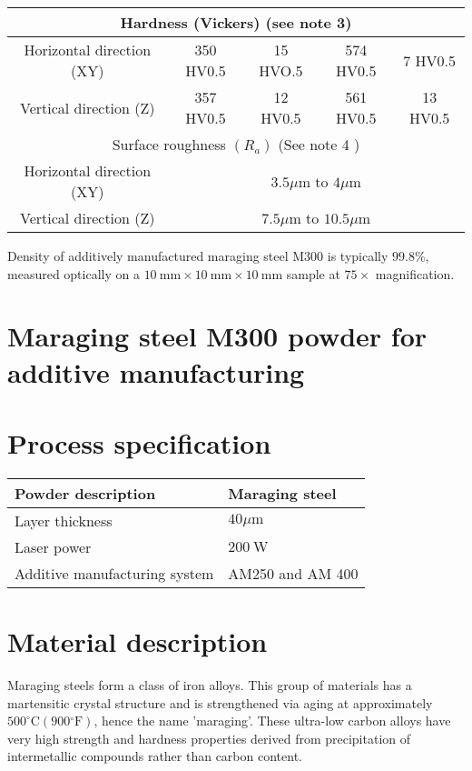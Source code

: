 \documentclass[10pt]{article}
\begin{document}
\begin{center}
\begin{tabular}{|c|c|c|c|c|}
\hline
\multicolumn{5}{|c|}{Hardness (Vickers) (see note 3)} \\
\hline
Horizontal direction (XY) & 350 HV0.5 & 15 HVO.5 & 574 HV0.5 & 7 HV0.5 \\
\hline
Vertical direction (Z) & 357 HV0.5 & 12 HV0.5 & 561 HV0.5 & 13 HV0.5 \\
\hline
\multicolumn{5}{|c|}{Surface roughness $\left(R_{a}\right)$ (See note 4 )} \\
\hline
Horizontal direction (XY) & \multicolumn{4}{|c|}{$3.5 \mu \mathrm{m}$ to $4 \mu \mathrm{m}$} \\
\hline
Vertical direction (Z) & \multicolumn{4}{|c|}{$7.5 \mu \mathrm{m}$ to $10.5 \mu \mathrm{m}$} \\
\hline
\end{tabular}
\end{center}

Density of additively manufactured maraging steel M300 is typically $99.8 \%$, measured optically on a $10 \mathrm{~mm} \times 10 \mathrm{~mm} \times 10 \mathrm{~mm}$ sample at $75 \times$ magnification.

\section*{Maraging steel M300 powder for additive manufacturing}
\section*{Process specification}
\begin{center}
\begin{tabular}{|l|l|}
\hline
Powder description & Maraging steel \\
\hline
Layer thickness & $40 \mu \mathrm{m}$ \\
\hline
Laser power & $200 \mathrm{~W}$ \\
\hline
Additive manufacturing system & AM250 and AM 400 \\
\hline
\end{tabular}
\end{center}

\section*{Material description}
Maraging steels form a class of iron alloys. This group of materials has a martensitic crystal structure and is strengthened via aging at approximately $500^{\circ} \mathrm{C}\left(900{ }^{\circ} \mathrm{F}\right)$, hence the name 'maraging'. These ultra-low carbon alloys have very high strength and hardness properties derived from precipitation of intermetallic compounds rather than carbon content.
\end{document}
